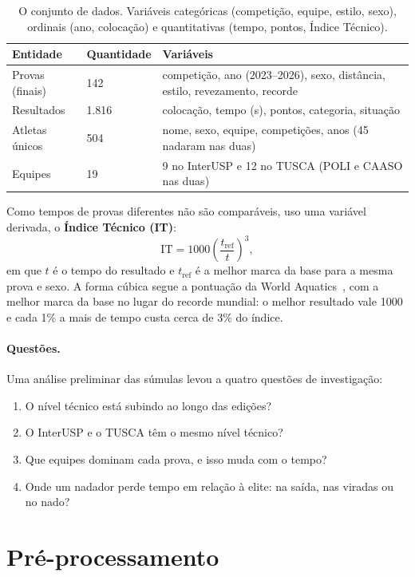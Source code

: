 \documentclass[11pt,a4paper]{article}
\begin{document}
\begin{table}[H]
\centering\small
\begin{tabular}{lll}
\toprule
Entidade & Quantidade & Variáveis \\
\midrule
Provas (finais) & 142 & competição, ano (2023--2026), sexo, distância, estilo, revezamento, recorde \\
Resultados & 1.816 & colocação, tempo (s), pontos, categoria, situação \\
Atletas únicos & 504 & nome, sexo, equipe, competições, anos (45 nadaram nas duas) \\
Equipes & 19 & 9 no InterUSP e 12 no TUSCA (POLI e CAASO nas duas) \\
\bottomrule
\end{tabular}
\caption{O conjunto de dados. Variáveis categóricas (competição, equipe, estilo, sexo), ordinais (ano,
colocação) e quantitativas (tempo, pontos, Índice Técnico).}
\label{tab:dados}
\end{table}

Como tempos de provas diferentes não são comparáveis, uso uma variável derivada, o \textbf{Índice Técnico (IT)}:
\[
\mathrm{IT} = 1000 \left(\frac{t_{\text{ref}}}{t}\right)^3,
\]
em que $t$ é o tempo do resultado e $t_{\text{ref}}$ é a melhor marca da base para a mesma prova e sexo. A forma
cúbica segue a pontuação da World Aquatics~\cite{wa-points}, com a melhor marca da base no lugar do recorde mundial:
o melhor resultado vale 1000 e cada 1\% a mais de tempo custa cerca de 3\% do índice.

\paragraph{Questões.} Uma análise preliminar das súmulas levou a quatro questões de investigação:
\begin{enumerate}[label=\textbf{Q\arabic*},leftmargin=2.2em]
  \item O nível técnico está subindo ao longo das edições?
  \item O InterUSP e o TUSCA têm o mesmo nível técnico?
  \item Que equipes dominam cada prova, e isso muda com o tempo?
  \item Onde um nadador perde tempo em relação à elite: na saída, nas viradas ou no nado?
\end{enumerate}

\section{Pré-processamento}\label{sec:prep}
\end{document}
